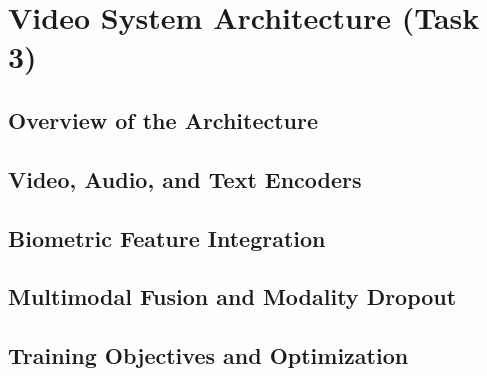 \chapter{Video System Architecture (Task 3)}\label{cap:test}

\section{Overview of the Architecture}\label{sec:cap05-overview}

\section{Video, Audio, and Text Encoders}\label{sec:video-audio-text-encoders}

\section{Biometric Feature Integration}\label{sec:biometric-feature-integration}

\section{Multimodal Fusion and Modality Dropout}\label{sec:multimodal-fusion-modality-dropout}

\section{Training Objectives and Optimization}\label{sec:cap05-training-objectives}
